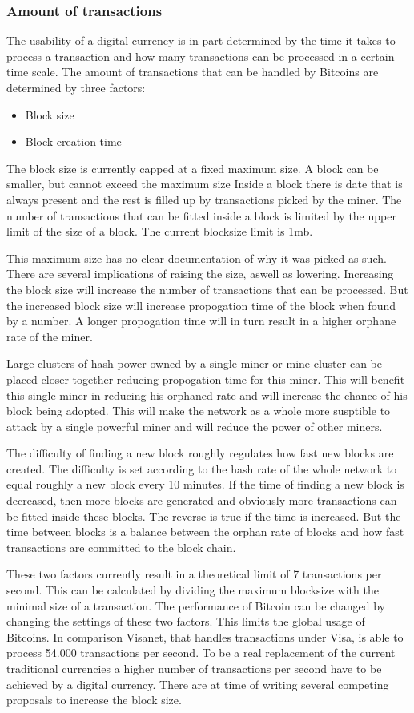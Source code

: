 \subsubsection{Amount of transactions}
The usability of a digital currency is in part determined by the time it takes to process a transaction
and how many transactions can be processed in a certain time scale.
The amount of transactions that can be handled by Bitcoins are determined by three factors:
\begin{itemize}
\item Block size
\item Block creation time
\end{itemize}

The block size is currently capped at a fixed maximum size.
A block can be smaller, but cannot exceed the maximum size
Inside a block there is date that is always present and the rest is filled up by transactions picked by the miner.
The number of transactions that can be fitted inside a block is limited by the upper limit of the size of a block.
The current blocksize limit is 1mb.

This maximum size has no clear documentation of why it was picked as such.
There are several implications of raising the size, aswell as lowering.
Increasing the block size will increase the number of transactions that can be processed.
But the increased block size will increase propogation time of the block when found by a number.
A longer propogation time will in turn result in a higher orphane rate of the miner.

Large clusters of hash power owned by a single miner or mine cluster can be placed closer together
reducing propogation time for this miner.
This will benefit this single miner in reducing his orphaned rate
and will increase the chance of his block being adopted.
This will make the network as a whole more susptible to attack by a single powerful miner
and will reduce the power of other miners.

The difficulty of finding a new block roughly regulates how fast new blocks are created.
The difficulty is set according to the hash rate of the whole network to equal roughly a new block every 10 minutes.
If the time of finding a new block is decreased,
then more blocks are generated and obviously more transactions can be fitted inside these blocks.
The reverse is true if the time is increased.
But the time between blocks is a balance between the orphan rate of blocks
and how fast transactions are committed to the block chain.

These two factors currently result in a theoretical limit of 7 transactions per second.
This can be calculated by dividing the maximum blocksize with the minimal size of a transaction.
The performance of Bitcoin can be changed by changing the settings of these two factors.
This limits the global usage of Bitcoins.
In comparison Visanet, that handles transactions under Visa, is able to process 54.000 transactions per second.
To be a real replacement of the current traditional currencies
a higher number of transactions per second have to be achieved by a digital currency.
There are at time of writing several competing proposals to increase the block size\cite{garzik-blocksize}\cite{andresen-blocksize}.

